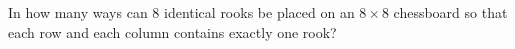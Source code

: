 In how many ways can $8$ identical rooks be placed on an $8\times8$ chessboard so that each row and each column contains exactly one rook?
